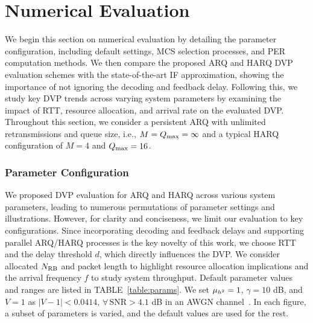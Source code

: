 

\section{Numerical Evaluation}\label{sec:simulations}
We begin this section on numerical evaluation by detailing the parameter configuration, including default settings, MCS selection processes, and PER computation methods. 
We then compare the proposed ARQ and HARQ DVP evaluation schemes with the state-of-the-art IF approximation, showing the importance of not ignoring the decoding and feedback delay. 
Following this, we study key DVP trends across varying system parameters by examining the impact of RTT, resource allocation, and arrival rate on the evaluated DVP. Throughout this section, we consider a persistent ARQ with unlimited retransmissions and queue size, i.e., $M = Q_{\mathrm{max}} = \infty$ and a typical HARQ configuration of $M = 4$ and $Q_{\mathrm{max}} = 16$. 

\subsubsection*{Parameter Configuration}
We proposed DVP evaluation for ARQ and HARQ across various system parameters, leading to numerous permutations of parameter settings and illustrations. However, for clarity and conciseness, we limit our evaluation to key configurations.
Since incorporating decoding and feedback delays and supporting parallel ARQ/HARQ processes is the key novelty of this work, we choose RTT and the delay threshold $d$, which directly influences the DVP. 
We consider allocated $N_{\mathrm{RB}}$ and packet length to highlight resource allocation implications and the arrival frequency $f$ to study system throughput. 
Default parameter values and ranges are listed in TABLE~\ref{table:params}. We set ${\mu_{h^2}}=1$, $\gamma = 10$ dB, and $V=1$ as $\vert V-1\vert<0.0414,\,\forall\,\text{SNR}>4.1$ dB in an AWGN channel~\cite{polyanskiy2010FBL}. In each figure, a subset of parameters is varied, and the default values are used for the rest.

